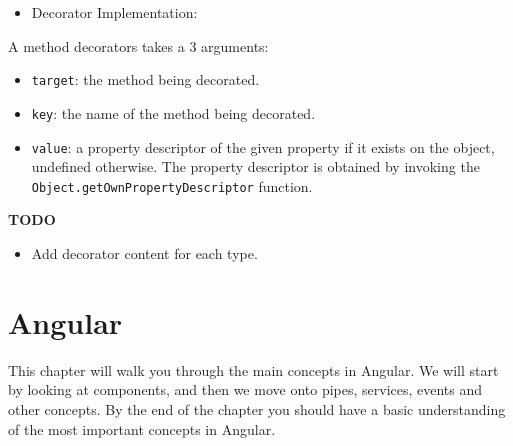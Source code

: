 \documentclass[12pt,]{article}
\newenvironment{Shaded}{}{}
\newcommand{\KeywordTok}[1]{\textcolor[rgb]{0.00,0.00,1.00}{{#1}}}
\newcommand{\FunctionTok}[1]{{#1}}
\newcommand{\NormalTok}[1]{{#1}}
\providecommand{\tightlist}{%
  \setlength{\itemsep}{0pt}\setlength{\parskip}{0pt}}
\begin{document}
\begin{itemize}
\tightlist
\item
  Decorator Implementation:
\end{itemize}

\begin{Shaded}
\end{Shaded}

A method decorators takes a 3 arguments:

\begin{itemize}
\tightlist
\item
  \texttt{target}: the method being decorated.
\item
  \texttt{key}: the name of the method being decorated.
\item
  \texttt{value}: a property descriptor of the given property if it
  exists on the object, undefined otherwise. The property descriptor is
  obtained by invoking the \texttt{Object.getOwnPropertyDescriptor}
  function.
\end{itemize}

\textbf{TODO}

\begin{itemize}
\tightlist
\item
  Add decorator content for each type.
\end{itemize}

\section{Angular}\label{angular}

This chapter will walk you through the main concepts in Angular. We will
start by looking at components, and then we move onto pipes, services,
events and other concepts. By the end of the chapter you should have a
basic understanding of the most important concepts in Angular.
\end{document}
